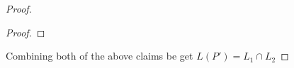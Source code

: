 \begin{soln}
\begin{proof}
\begin{proof}
\end{proof}
Combining both of the above claims be get $L(P')=L_1 \cap L_2$


\end{proof}
\end{soln}
